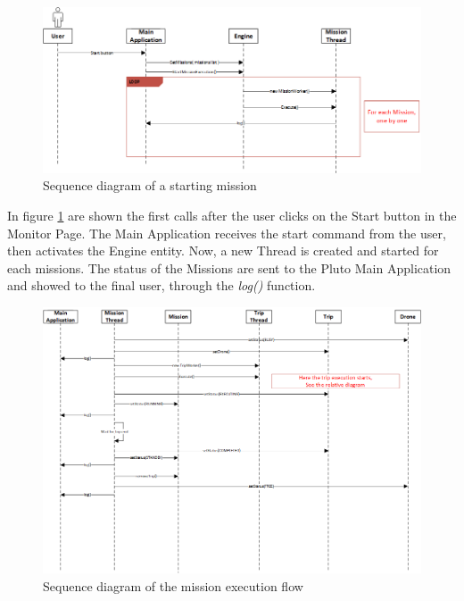  \begin{figure}[H]
   \centering
   \includegraphics[width=\linewidth]{pictures/Alfalfa_Sequence_MissionStart.png}
   \caption{Sequence diagram of a starting mission}
   \label{fig:alfalfaSequence1}
 \end{figure}

In figure \ref{fig:alfalfaSequence1} are shown the first calls after the user clicks on the Start button in the Monitor Page.
The Main Application receives the start command from the user, then activates the Engine entity. Now, a new Thread is created and started for each missions. The status of the Missions are sent to the Pluto Main Application and showed to the final user, through the \textit{log()} function.
\\

 \begin{figure}[H]
   \centering
   \includegraphics[width=\linewidth]{pictures/Alfalfa_Sequence_MissionExecution.png}
   \caption{Sequence diagram of the mission execution flow}
   \label{fig:alfalfaSequence2}
 \end{figure}

